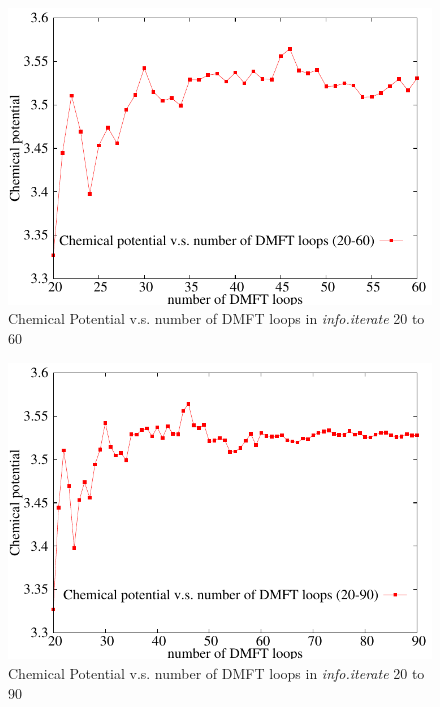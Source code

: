 \documentclass[12 pt]{article}
\begin{document}
\begin{itemize}[leftmargin=0.2in]
\begin{itemize}[leftmargin=0.5in]
  \begin{figure}[ht]
    \centering
    \captionsetup{justification=centering}
    \caption{Chemical Potential v.s. number of DMFT loops in \emph{info.iterate} 20 to 60}
    \label{Chemical Potential v.s. number of DMFT loops in info.iterate 20 to 60}
    \vspace{2ex}
    \includegraphics[scale=0.6]{gnuplotChemicalPotential2}
  \end{figure}

  \begin{figure}[ht]
    \centering
    \captionsetup{justification=centering}
    \caption{Chemical Potential v.s. number of DMFT loops in \emph{info.iterate} 20 to 90}
    \label{Chemical Potential v.s. number of DMFT loops in info.iterate 20 to 90}
    \vspace{2ex}
    \includegraphics[scale=0.6]{gnuplotChemicalPotential3}
  \end{figure}


\end{itemize}
\end{itemize}
\end{document}
